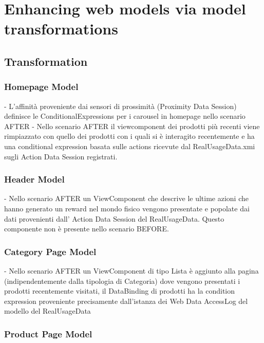 \chead{}

\chapter{Enhancing web models via model transformations}
\label{enhancing-web-models-via-model-transformations}

\section{Transformation}

\subsection{Homepage Model}

- L’affinità proveniente dai sensori di prossimità (Proximity Data Session) definisce le ConditionalExpressions per i carousel in homepage nello scenario AFTER
- Nello scenario AFTER il viewcomponent dei prodotti più recenti viene rimpiazzato con quello dei prodotti con i quali si è interagito recentemente e ha una conditional expression basata sulle actions ricevute dal RealUsageData.xmi sugli Action Data Session registrati.

\subsection{Header Model}

- Nello scenario AFTER un ViewComponent che descrive le ultime azioni che hanno generato un reward nel mondo fisico vengono presentate e popolate dai dati provenienti dall’ Action Data Session del RealUsageData. Questo componente non è presente nello scenario BEFORE.

\subsection{Category Page Model}

- Nello scenario AFTER un ViewComponent di tipo Lista è aggiunto alla pagina (indipendentemente dalla tipologia di Categoria) dove vengono presentati i prodotti recentemente visitati, il DataBinding di prodotti ha la condition expression proveniente precisamente dall’istanza dei Web Data AccessLog del modello del RealUsageData

\subsection{Product Page Model}

